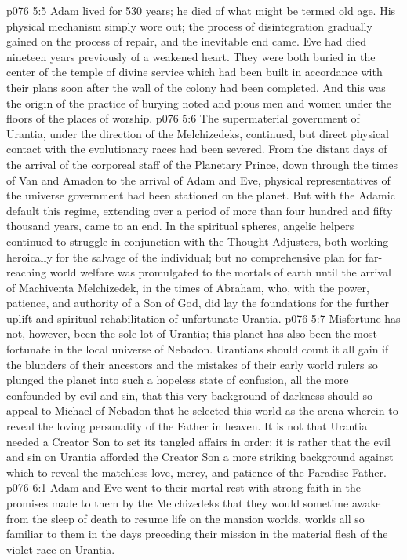 \vs p076 5:5 \pc Adam lived for 530 years; he died of what might be termed old age. His physical mechanism simply wore out; the process of disintegration gradually gained on the process of repair, and the inevitable end came. Eve had died nineteen years previously of a weakened heart. They were both buried in the center of the temple of divine service which had been built in accordance with their plans soon after the wall of the colony had been completed. And this was the origin of the practice of burying noted and pious men and women under the floors of the places of worship.
\vs p076 5:6 \pc The supermaterial government of Urantia, under the direction of the Melchizedeks, continued, but direct physical contact with the evolutionary races had been severed. From the distant days of the arrival of the corporeal staff of the Planetary Prince, down through the times of Van and Amadon to the arrival of Adam and Eve, physical representatives of the universe government had been stationed on the planet. But with the Adamic default this regime, extending over a period of more than four hundred and fifty thousand years, came to an end. In the spiritual spheres, angelic helpers continued to struggle in conjunction with the Thought Adjusters, both working heroically for the salvage of the individual; but no comprehensive plan for far\hyp{}reaching world welfare was promulgated to the mortals of earth until the arrival of Machiventa Melchizedek, in the times of Abraham, who, with the power, patience, and authority of a Son of God, did lay the foundations for the further uplift and spiritual rehabilitation of unfortunate Urantia.
\vs p076 5:7 Misfortune has not, however, been the sole lot of Urantia; this planet has also been the most fortunate in the local universe of Nebadon. Urantians should count it all gain if the blunders of their ancestors and the mistakes of their early world rulers so plunged the planet into such a hopeless state of confusion, all the more confounded by evil and sin, that this very background of darkness should so appeal to Michael of Nebadon that he selected this world as the arena wherein to reveal the loving personality of the Father in heaven. It is not that Urantia needed a Creator Son to set its tangled affairs in order; it is rather that the evil and sin on Urantia afforded the Creator Son a more striking background against which to reveal the matchless love, mercy, and patience of the Paradise Father.
\vs p076 6:1 Adam and Eve went to their mortal rest with strong faith in the promises made to them by the Melchizedeks that they would sometime awake from the sleep of death to resume life on the mansion worlds, worlds all so familiar to them in the days preceding their mission in the material flesh of the violet race on Urantia.
